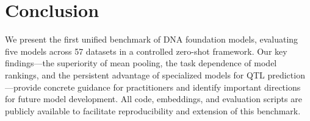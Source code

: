 \documentclass[11pt]{article}
\begin{document}
\section{Conclusion}

We present the first unified benchmark of DNA foundation models, evaluating five models across 57 datasets in a controlled zero-shot framework. Our key findings---the superiority of mean pooling, the task dependence of model rankings, and the persistent advantage of specialized models for QTL prediction---provide concrete guidance for practitioners and identify important directions for future model development. All code, embeddings, and evaluation scripts are publicly available to facilitate reproducibility and extension of this benchmark.



\end{document}
